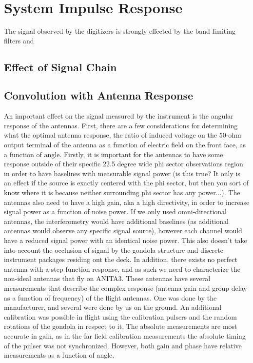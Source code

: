 \section{System Impulse Response}
		The signal observed by the digitizers is strongly effected by the band limiting filters and 
	\subsection{Effect of Signal Chain}
	
	\subsection{Convolution with Antenna Response}
		An important effect on the signal measured by the instrument is the angular response of the antennas.  First, there are a few considerations for determining what the optimal antenna response, the ratio of induced voltage on the 50-ohm output terminal of the antenna as a function of electric field on the front face, as a function of angle.  Firstly, it is important for the antennas to have some response outside of their specific 22.5 degree wide phi sector observations region in order to have baselines with measurable signal power (is this true?  It only is an effect if the source is exactly centered with the phi sector, but then you sort of know where it is because neither surrounding phi sector has any power...).  The antennas also need to have a high gain, aka a high directivity, in order to increase signal power as a function of noise power.  If we only used omni-directional antennas, the interferometry would have additional baselines (as additional antennas would observe any specific signal source), however each channel would have a reduced signal power with an identical noise power.  This also doesn't take into account the occlusion of signal by the gondola structure and discrete instrument packages residing ont the deck.  In addition, there exists no perfect antenna with a step function response, and as such we need to characterize the non-ideal antennas that fly on ANITA3.
		These antennas have several measurements that describe the complex response (antenna gain and group delay as a function of frequency) of the flight antennas.  One was done by the manufacturer, and several were done by us on the ground.  An additional calibration was possible in flight using the calibration pulsers and the random rotations of the gondola in respect to it.  The absolute measurements are most accurate in gain, as in the far field calibration measurements the absolute timing of the pulser was not synchronized.  However, both gain and phase have relative measurements as a function of angle.
